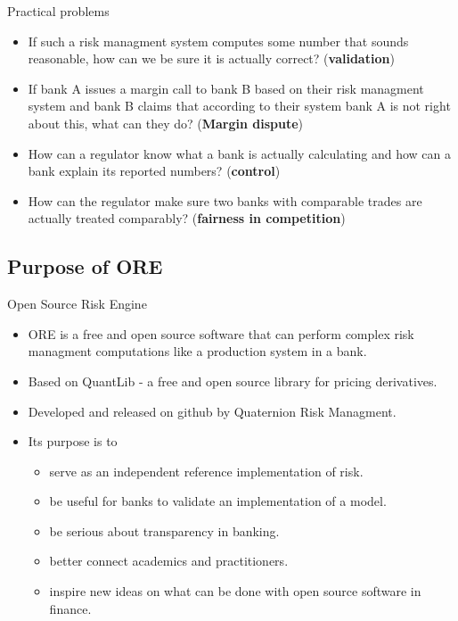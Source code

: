 \documentclass[t]{beamer}
\begin{document}
\begin{frame}{Practical problems}
	\begin{itemize}
		\item
			If such a risk managment system computes some number that sounds reasonable, how can we be sure it is actually correct? (\textbf{validation})
		\item
			If bank A issues a margin call to bank B based on their risk managment system and bank B claims that according to their system bank A is not right about this, what can they do? (\textbf{Margin dispute})
		\item
			How can a regulator know what a bank is actually calculating and how can a bank explain its reported numbers? (\textbf{control}) 
		\item
			How can the regulator make sure two banks with comparable trades are actually treated comparably? (\textbf{fairness in competition})
	\end{itemize}
\end{frame}

\subsection{Purpose of ORE}

\begin{frame}{Open Source Risk Engine}
	\begin{itemize}
		\item
			ORE is a free and open source software that can perform complex risk managment computations like a production system in a bank.
		\item
			Based on QuantLib - a free and open source library for pricing derivatives.
		\item
			Developed and released on github by Quaternion Risk Managment.  
		\item
			Its purpose is to
				\begin{itemize}
					\item
						serve as an independent reference implementation of risk.
					\item
						be useful for banks to validate an implementation of a model.
					\item
						be serious about transparency in banking.
					\item
						better connect academics and practitioners.
					\item
						inspire new ideas on what can be done with open source software in finance.
				\end{itemize}
	\end{itemize}
\end{frame}
\end{document}
